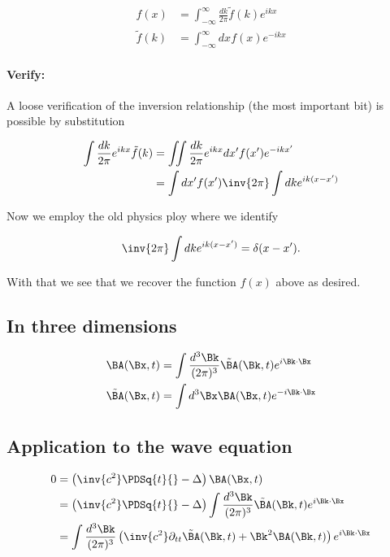 \begin{align}\label{eqn:relativisticElectrodynamicsL15:390}
f(x) &= \int_{-\infty}^\infty \frac{dk}{2\pi} \tilde{f}(k) e^{i k x} \\
\tilde{f}(k) &= \int_{-\infty}^\infty dx f(x) e^{-i k x}
\end{align}

\paragraph{Verify:}

A loose verification of the inversion relationship (the most important bit) is possible by substitution

\begin{align*}
\int \frac{dk}{2\pi} e^{i k x} \tilde{f}(k) 
&= 
\iint \frac{dk}{2\pi} e^{i k x} dx' f(x') e^{-i k x'} \\
&= 
\int dx' f(x') \inv{2\pi} \int dk e^{i k (x - x')}
\end{align*}

Now we employ the old physics ploy where we identify

\begin{equation}\label{eqn:relativisticElectrodynamicsL15:820}
\inv{2\pi} \int dk e^{i k (x - x')} = \delta(x - x').
\end{equation}

With that we see that we recover the function $f(x)$ above as desired.

\subsection{In three dimensions}

\begin{align}\label{eqn:relativisticElectrodynamicsL15:470}
\BA(\Bx, t) &= \int 
\frac{d^3 \Bk}{(2\pi)^3} 
\tilde{\BA}(\Bk, t) e^{i \Bk \cdot \Bx} \\
\tilde{\BA}(\Bx, t) &= \int d^3 \Bx \BA(\Bx, t) e^{-i \Bk \cdot \Bx}
\end{align}

\subsection{Application to the wave equation}

\begin{align*}
0 &= 
\left( \inv{c^2} \PDSq{t}{} - \Delta \right) \BA(\Bx, t) \\
&=
\left( \inv{c^2} \PDSq{t}{} - \Delta \right) 
\int 
\frac{d^3 \Bk}{(2\pi)^3} 
\tilde{\BA}(\Bk, t) e^{i \Bk \cdot \Bx} \\
&=
\int 
\frac{d^3 \Bk}{(2\pi)^3} 
\left( 
\inv{c^2} \partial_{tt} \tilde{\BA}(\Bk, t) + \Bk^2 \BA(\Bk, t)
\right)
e^{i \Bk \cdot \Bx} 
\end{align*}

